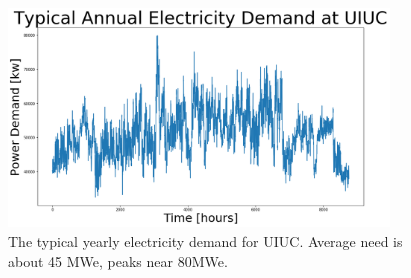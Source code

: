 \begin{frame}

	\begin{figure}
		\centering
		\includegraphics[width=0.9\textwidth]{./images/typical_demand.png}
		\caption*{The typical yearly electricity demand for UIUC. Average need is about 45 MWe, peaks near 80MWe.}
	\end{figure}

\end{frame}